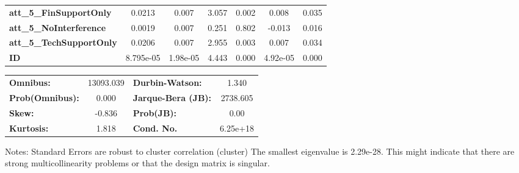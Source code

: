 \begin{center}
\begin{tabular}{lcccccc}
\textbf{att\_5\_FinSupportOnly}      &       0.0213  &        0.007     &     3.057  &         0.002        &        0.008    &        0.035     \\
\textbf{att\_5\_NoInterference}      &       0.0019  &        0.007     &     0.251  &         0.802        &       -0.013    &        0.016     \\
\textbf{att\_5\_TechSupportOnly}     &       0.0206  &        0.007     &     2.955  &         0.003        &        0.007    &        0.034     \\
\textbf{ID}                          &    8.795e-05  &     1.98e-05     &     4.443  &         0.000        &     4.92e-05    &        0.000     \\
\bottomrule
\end{tabular}
\begin{tabular}{lclc}
\textbf{Omnibus:}       & 13093.039 & \textbf{  Durbin-Watson:     } &    1.340  \\
\textbf{Prob(Omnibus):} &    0.000  & \textbf{  Jarque-Bera (JB):  } & 2738.605  \\
\textbf{Skew:}          &   -0.836  & \textbf{  Prob(JB):          } &     0.00  \\
\textbf{Kurtosis:}      &    1.818  & \textbf{  Cond. No.          } & 6.25e+18  \\
\bottomrule
\end{tabular}
\end{center}

Notes: \newline
 [1] Standard Errors are robust to cluster correlation (cluster) \newline
 [2] The smallest eigenvalue is 2.29e-28. This might indicate that there are \newline
 strong multicollinearity problems or that the design matrix is singular.